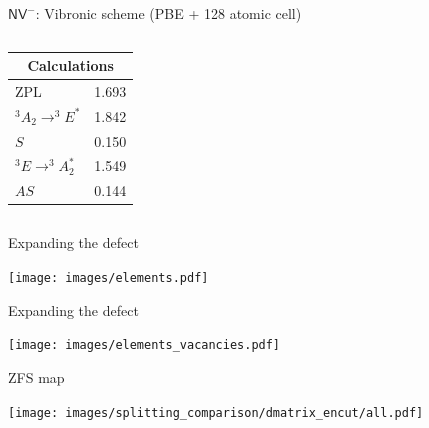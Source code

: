 \documentclass[]{beamer}
\begin{document}
\begin{frame}{ $ \mathsf{NV}^{-} $: Vibronic scheme (PBE + 128 atomic cell)}
{\begin{columns}
\begin{column}{0.3333\textwidth}
        \begin{center}
          \small
          \begin{tabular}{lc}
            \hline
            \multicolumn{2}{c}{Calculations}\\
            \hline
            ZPL & 1.693\\
            \hline
            $ ^3A_2 \to ^3E^{*} $  & 1.842\\
            \hline
            $ S $  & 0.150\\
            \hline
            $  ^3E \to ^3A_2^{*} $  & 1.549\\
            \hline
            $ AS $  & 0.144\\
            \hline
          \end{tabular}
        \end{center}
      \end{column}
    \end{columns}
    }
  \end{frame}

\begin{frame}{Expanding the defect}
  \begin{center}
    \texttt{[image: images/elements.pdf]}
  \end{center}
\end{frame}

\begin{frame}{Expanding the defect}
  \begin{center}
    \texttt{[image: images/elements\_vacancies.pdf]}
  \end{center}
\end{frame}

\begin{frame}{ZFS map}
  \begin{center}
    \texttt{[image: images/splitting\_comparison/dmatrix\_encut/all.pdf]}
  \end{center}
\end{frame}
\end{document}
